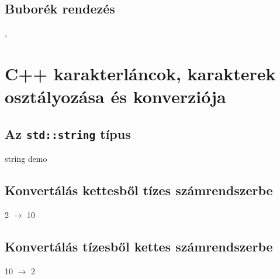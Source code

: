 \documentclass[usenames,dvipsnames,aspectratio=169]{beamer}
\begin{document}
\subsection{Buborék rendezés}
\begin{frame}
  \begin{exampleblock}{ , %
    }
    \tiny
    \vspace{-.2cm}
    
    \vspace{-.2cm}
  \end{exampleblock}
\end{frame}

\section{C++ karakterláncok, karakterek osztályozása és konverziója}
\subsection{Az \texttt{std::string} típus}
\begin{frame}
  \begin{exampleblock}{ string demo}
    \scriptsize
    \vspace{-.2cm}
    
    \vspace{-.2cm}
  \end{exampleblock}
\end{frame}

\subsection{Konvertálás kettesből tízes számrendszerbe}
\begin{frame}
  \begin{exampleblock}{ 2 $\to$ 10}
    \footnotesize
    \vspace{-.2cm}
    
    \vspace{-.2cm}
  \end{exampleblock}
\end{frame}

\subsection{Konvertálás tízesből kettes számrendszerbe}
\begin{frame}
  \begin{exampleblock}{ 10 $\to$ 2}
    \small
    
  \end{exampleblock}
\end{frame}
\end{document}
